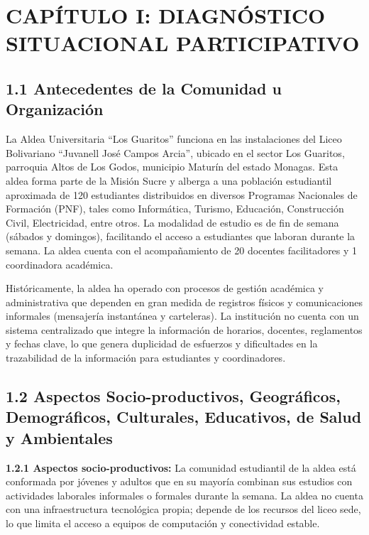 \documentclass[12pt, letterpaper]{article}
\begin{document}
	\newpage
	\section*{CAPÍTULO I: DIAGNÓSTICO SITUACIONAL PARTICIPATIVO}
	
	\subsection*{1.1 Antecedentes de la Comunidad u Organización}
	La Aldea Universitaria “Los Guaritos” funciona en las instalaciones del Liceo Bolivariano “Juvanell José Campos Arcia”, ubicado en el sector Los Guaritos, parroquia Altos de Los Godos, municipio Maturín del estado Monagas. Esta aldea forma parte de la Misión Sucre y alberga a una población estudiantil aproximada de 120 estudiantes distribuidos en diversos Programas Nacionales de Formación (PNF), tales como Informática, Turismo, Educación, Construcción Civil, Electricidad, entre otros. La modalidad de estudio es de fin de semana (sábados y domingos), facilitando el acceso a estudiantes que laboran durante la semana. La aldea cuenta con el acompañamiento de 20 docentes facilitadores y 1 coordinadora académica.

	Históricamente, la aldea ha operado con procesos de gestión académica y administrativa que dependen en gran medida de registros físicos y comunicaciones informales (mensajería instantánea y carteleras). La institución no cuenta con un sistema centralizado que integre la información de horarios, docentes, reglamentos y fechas clave, lo que genera duplicidad de esfuerzos y dificultades en la trazabilidad de la información para estudiantes y coordinadores.
	
	\subsection*{1.2 Aspectos Socio-productivos, Geográficos, Demográficos, Culturales, Educativos, de Salud y Ambientales}
	
	\textbf{1.2.1 Aspectos socio-productivos:} La comunidad estudiantil de la aldea está conformada por jóvenes y adultos que en su mayoría combinan sus estudios con actividades laborales informales o formales durante la semana. La aldea no cuenta con una infraestructura tecnológica propia; depende de los recursos del liceo sede, lo que limita el acceso a equipos de computación y conectividad estable.
	
\end{document}

